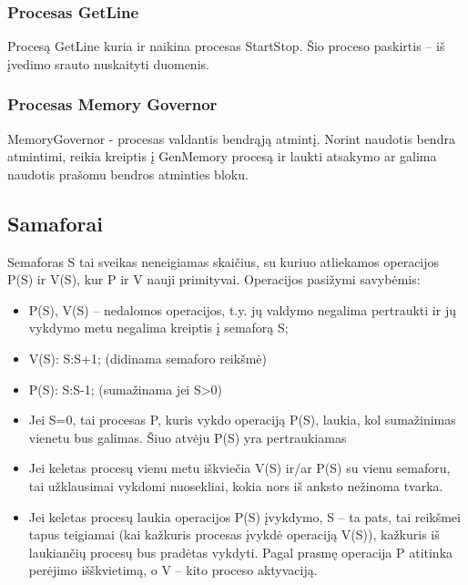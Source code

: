 \subsubsection{Procesas GetLine}
Procesą GetLine kuria ir naikina procesas StartStop. Šio proceso paskirtis – iš įvedimo srauto nuskaityti duomenis. 

\subsubsection{Procesas Memory Governor}
MemoryGovernor - procesas valdantis bendrąją atmintį. Norint naudotis bendra atmintimi, reikia kreiptis į GenMemory procesą ir laukti atsakymo ar galima naudotis prašomu bendros atminties bloku.
\subsection{Samaforai}

Semaforas S tai sveikas neneigiamas skaičius, su kuriuo atliekamos operacijos P(S) ir V(S), kur P ir V nauji primityvai. Operacijos pasižymi savybėmis:
\begin{itemize}
	\item P(S), V(S) – nedalomos operacijos, t.y. jų valdymo negalima pertraukti ir jų vykdymo metu negalima kreiptis į semaforą S;
	\item V(S):     S:S+1; (didinama semaforo reikšmė)
	\item P(S):      S:S-1; (sumažinama jei S>0)
	\item Jei S=0, tai procesas P, kuris vykdo operaciją P(S), laukia, kol sumažinimas vienetu bus galimas. Šiuo atvėju P(S) yra pertraukiamas
	\item Jei keletas procesų vienu metu iškviečia V(S) ir/ar P(S) su vienu semaforu, tai užklausimai vykdomi nuosekliai, kokia nors iš anksto nežinoma tvarka.
	\item Jei keletas procesų laukia operacijos P(S) įvykdymo, S – ta pats, tai reikšmei tapus teigiamai (kai kažkuris procesas įvykdė operaciją V(S)), kažkuris iš laukiančių procesų bus pradėtas vykdyti.
Pagal prasmę operacija P atitinka perėjimo išškvietimą, o V – kito proceso aktyvaciją.
\end{itemize}

